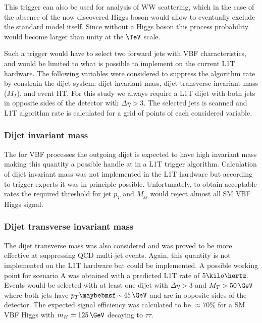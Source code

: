 This trigger can also be used for analysis of WW scattering, which in the case of the absence of the now discovered Higgs boson would allow to eventually exclude the standard model itself. Since without a Higgs boson this process probability would become larger than unity at the $\TeV$ scale.

Such a trigger would have to select two forward jets with \gls{VBF} characteristics, and would be limited to what is possible to implement on the current \gls{L1T} hardware. The following variables were considered to suppress the algorithm rate by constrain the dijet system: dijet invariant mass, dijet transverse invariant mass ($M_{T}$), and event \gls{HT}. For this study we always require a \gls{L1T} dijet with both jets in opposite sides of the detector with $\Delta\eta>3$. The selected jets \pt is scanned and \gls{L1T} algorithm rate is calculated for a grid of points of each considered variable.

\subsubsection{Dijet invariant mass}


The for \gls{VBF} processes the outgoing dijet is expected to have high invariant mass making this quantity a possible handle at in a \gls{L1T} trigger algorithm. Calculation of dijet invariant mass was not implemented in the \gls{L1T} hardware but according to trigger experts it was in principle possible. Unfortunately, to obtain acceptable rates the required threshold for jet $p_T$ and $M_{jj}$ would reject almost all \gls{SM} \gls{VBF} Higgs signal.

\subsubsection{Dijet transverse invariant mass}


The dijet transverse mass was also considered and was proved to be more effective at suppressing \gls{QCD} multi-jet events. Again, this quantity is not implemented on the \gls{L1T} hardware but could be implemented. A possible working point for scenario A was obtained with a predicted \gls{L1T} rate of $5\kilo\hertz$. Events would be selected with at least one dijet with $\Delta\eta>3$ and $M_T>50\,\GeV$ where both jets have $p_T \sim 45\,\GeV$ and are in opposite sides of the detector. The expected signal efficiency was calculated to be $\approx 70\%$ for a \gls{SM} \gls{VBF} Higgs with $m_H=125\,\GeV$ decaying to $\tau\tau$.

